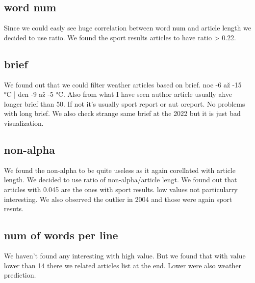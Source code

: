 \documentclass{article}
\begin{document}
    \subsection{word num}
    Since we could easly see huge correlation between word num and article length we decided to use ratio. We found the sport results articles to have ratio > 0.22.



    \subsection{brief}
    We found out that we could filter weather articles based on brief. noc -6 až -15 °C | den -9 až -5 °C. Also from what I have seen author article usually ahve longer brief than 50. If not it's usually sport report or aut oreport.
    No problems with long brief. We also check strange same brief at the 2022 but it is just bad visualization.


    \subsection{non-alpha}
    We found the non-alpha to be quite useless as it again corellated with article length. We decided to use ratio of non-alpha/article lengt. We found out that articles with 0.045 are the ones with sport results. low values not particularry interesting. We also observed the outlier in 2004 and those were again sport resuts.

    \subsection{num of words per line}
    We haven't found any interesting with high value. But we found that with value lower than 14 there we related articles list at the end. Lower were also weather prediction.




    



    \printbibliography
\end{document}
